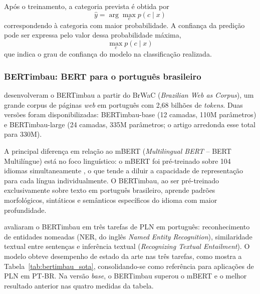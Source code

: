 \documentclass[
    12pt,                %
    openright,           %
    oneside,             %
    a4paper,             %
    english,             %
    brazil               %
]{abntex2}
\begin{document}
Após o treinamento, a categoria prevista é obtida por
\begin{equation}
\hat{y} = \arg\max_c p(c \mid x)
\end{equation}
correspondendo à categoria com maior probabilidade. A confiança da predição pode ser expressa pelo valor dessa probabilidade máxima,
\begin{equation}
\max_c p(c \mid x)
\end{equation}
que indica o grau de confiança do modelo na classificação realizada.

\subsubsection{BERTimbau: BERT para o português brasileiro}
\label{subsec:bertimbau}

\label{subsubsec:bertimbau_corpus}

 desenvolveram o BERTimbau a partir do BrWaC (\textit{Brazilian Web as Corpus}), um grande corpus de páginas \textit{web} em português com 2,68 bilhões de \textit{tokens}. Duas versões foram disponibilizadas: BERTimbau-base (12 camadas, 110M parâmetros) e BERTimbau-large (24 camadas, 335M parâmetros; o artigo arredonda esse total para 330M).

A principal diferença em relação ao mBERT (\textit{Multilingual BERT} -- BERT Multilíngue) está no foco linguístico: o mBERT foi pré-treinado sobre 104 idiomas simultaneamente \cite{pires2019}, o que tende a diluir a capacidade de representação para cada língua individualmente. O BERTimbau, ao ser pré-treinado exclusivamente sobre texto em português brasileiro, aprende padrões morfológicos, sintáticos e semânticos específicos do idioma com maior profundidade.

\label{subsubsec:bertimbau_desempenho}

 avaliaram o BERTimbau em três tarefas de PLN em português: reconhecimento de entidades nomeadas (NER, do inglês \textit{Named Entity Recognition}), similaridade textual entre sentenças e inferência textual (\textit{Recognizing Textual Entailment}). O modelo obteve desempenho de estado da arte nas três tarefas, como mostra a Tabela~\ref{tab:bertimbau_sota}, consolidando-se como referência para aplicações de PLN em PT-BR. Na versão \textit{base}, o BERTimbau superou o mBERT e o melhor resultado anterior nas quatro medidas da tabela.
\end{document}
